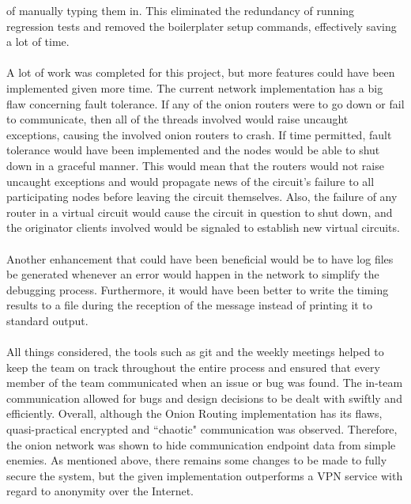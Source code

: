\documentclass[10pt]{report}
\begin{document}
of manually typing them in. This eliminated the redundancy of running regression tests and removed
the boilerplater setup commands, effectively saving a lot of time.\\\\
A lot of work was completed for this project, but more features could have been implemented given
more time. The current network implementation has a big flaw concerning fault tolerance. If any of
the onion routers were to go down or fail to communicate, then all of the
threads involved would raise uncaught exceptions, causing the involved onion routers to crash. If
time permitted, fault tolerance would have been implemented and the nodes would be able to shut down
in a graceful manner.  This would mean that the routers would not raise uncaught exceptions and
would propagate news of the circuit's failure to all participating nodes before leaving the circuit
themselves. Also, the failure of any router in a virtual circuit would cause the circuit in question
to shut down, and the originator clients involved  would be signaled to establish new virtual
circuits. \\\\
Another enhancement that could have been beneficial would be to have log files be generated whenever
an error would happen in the network to simplify the debugging process. Furthermore, it would have
been better to write the timing results to a file during the reception of the message instead of
printing it to standard output. \\\\
All things considered, the tools such as git and the weekly meetings helped to keep the team on
track throughout the entire process and ensured that every member of the team communicated when an
issue or bug was found. The in-team communication allowed for bugs and design decisions to be dealt
with swiftly and efficiently. Overall, although the Onion Routing implementation has its flaws,
quasi-practical encrypted and ``chaotic" communication was observed. Therefore, the onion network
was shown to hide communication endpoint data from simple enemies. As mentioned above, there
remains some changes to be made to fully secure the system, but the given implementation outperforms
a VPN service with regard to anonymity over the Internet.
\end{document}
